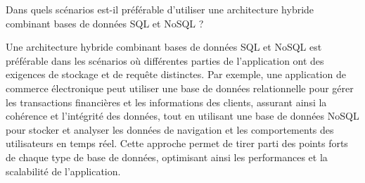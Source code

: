 \documentclass[12pt,a4paper,addpoints,answers]{exam}
\begin{document}
\begin{questions}
		\bonusquestion[2] Dans quels scénarios est-il préférable d'utiliser une architecture hybride combinant bases de données SQL et NoSQL ?
		
		\fillwithlines{15cm}
		
		\begin{solution}
			Une architecture hybride combinant bases de données SQL et NoSQL est préférable dans les scénarios où différentes parties de l'application ont des exigences de stockage et de requête distinctes. Par exemple, une application de commerce électronique peut utiliser une base de données relationnelle pour gérer les transactions financières et les informations des clients, assurant ainsi la cohérence et l'intégrité des données, tout en utilisant une base de données NoSQL pour stocker et analyser les données de navigation et les comportements des utilisateurs en temps réel. Cette approche permet de tirer parti des points forts de chaque type de base de données, optimisant ainsi les performances et la scalabilité de l'application.
		\end{solution}
		
	\end{questions}
	
\end{document}
